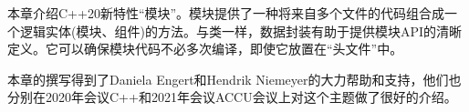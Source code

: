 本章介绍C++20新特性“模块”。模块提供了一种将来自多个文件的代码组合成一个逻辑实体(模块、组件)的方法。与类一样，数据封装有助于提供模块API的清晰定义。它可以确保模块代码不必多次编译，即使它放置在“头文件”中。

本章的撰写得到了Daniela Engert和Hendrik Niemeyer的大力帮助和支持，他们也分别在2020年会议C++和2021年会议ACCU会议上对这个主题做了很好的介绍。